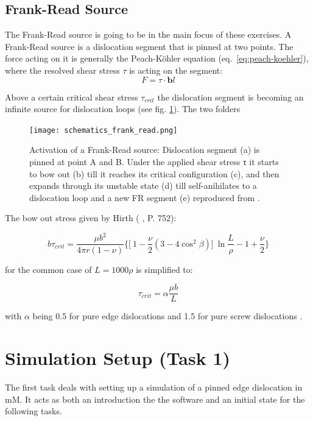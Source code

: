 \FloatBarrier
\subsection{Frank-Read Source}

The Frank-Read source is going to be in the main focus of these exercises. A Frank-Read source is a dislocation segment that is pinned at two points. The force acting on it is generally the Peach-Köhler equation (eq.~\ref{eq:peach-koehler}), where the resolved shear stress \(\tau\) is acting on the segment:
\begin{equation}
	F = \tau  \cdot \mathbf{b}l
\end{equation} 

Above a certain critical shear stress \(\tau_{crit}\) the dislocation segment is becoming an infinite source for dislocation loops (see fig. \ref{fig:frank-read-scheme}). The two folders 

\begin{figure}[htb]
	\centering
	\texttt{[image: schematics\_frank\_read.png]}
	\caption{ Activation of a Frank-Read source: Dislocation segment (a) is pinned at point A
		and B. Under the applied shear stress τ it starts to bow out (b) till it reaches
		its critical configuration (c), and then expands through its unstable state (d) till
		self-anihilates to a dislocation loop and a new FR segment (e) reproduced from \cite{zaiser}.}
	\label{fig:frank-read-scheme}
\end{figure}

The bow out stress given by Hirth ( \cite{anderson2017}, P. 752):

\begin{equation}
	b\tau_{crit} = \frac{\mu b^{2}}{4\pi r(1-\nu)} \biggl\{ \biggl[\ 1- \frac{\nu}{2}(3-4\cos^{2}\beta) \biggr]\ \ln \frac{L}{\rho} -1 + \frac{\nu}{2} \biggr\} \label{eq:tau_crit}
\end{equation}

for the common case of \( L =1000\rho \) is simplified to: 

\begin{equation}
	\tau_{crit} = \alpha \frac{\mu b}{L} \label{eq:tau_crit}
\end{equation}

with \(\alpha\) being 0.5 for pure edge dislocations and 1.5 for pure screw dislocations \cite{zaiser}. 

\section{Simulation Setup (Task 1)}
The first task deals with setting up a simulation of a pinned edge dislocation in mM. It acts as both an introduction the the software and an initial state for the following tasks.

